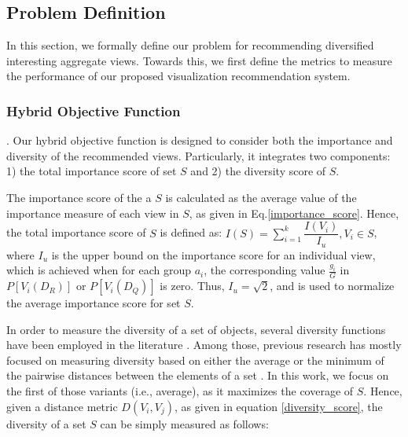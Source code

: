 
\subsection{Problem Definition}\label{subsec:problem_definition}
In this section, we formally define our problem for recommending diversified interesting aggregate views.  
%
Towards this, we first define the metrics to measure the performance of our proposed visualization recommendation system.


\subsubsection{Hybrid Objective Function}

. Our hybrid objective function is designed to consider both the importance and diversity of the recommended views. 
%
Particularly, it integrates two components: 1) the total importance score of set $S$ and 2) the diversity score of $S$.

The importance score of the a $S$ is calculated as the average value of the importance measure of each view in $S$, as given in Eq.\ref{importance_score}. 
%
Hence, the total importance score of $S$ is defined as: $ I\left(S\right)= \sum_{i=1}^{k} \dfrac{I(V_i )}{I_u}, V_i  \in S $, where $I_u$ is the upper bound on the importance score for an individual view, which is achieved when for each group $a_i$, the corresponding value $\frac{g_i}{G}$ in $P[V_{i}(D_R)]$ or $P[V_{i}(D_Q)]$ is zero. Thus, $I_u = \sqrt{2}$, and is used to normalize the average importance score for set $S$. 

In order to measure the diversity of a set of objects, several diversity functions have been employed in the literature \cite{Vieira2011, Clarke2008}. 
%
Among those, previous research has mostly focused on measuring diversity based on either the average or the minimum of the pairwise distances between the elements of a set \cite{Wu2014}. 
%
In this work, we focus on the first of those variants (i.e., average), as it maximizes the coverage of $S$. 
%
Hence, given a distance metric $ D\left(V_i, V_j\right) $, as given in equation \ref{diversity_score}, the diversity of a set $S$ can be simply measured as follows:

